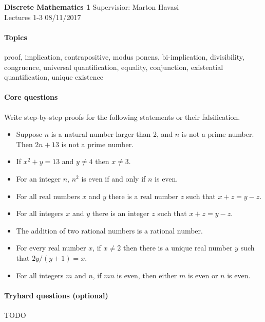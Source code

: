 \documentclass{exam}
\begin{document}
\noindent
\large\textbf{Discrete Mathematics 1} \hfill Supervisior: Marton Havasi \\
\normalsize Lectures 1-3 \hfill 08/11/2017
\paragraph{Topics}

proof, implication, contrapositive, modus ponens, bi-implication, divisibility, congruence, universal quantification, equality, conjunction, existential quantification, unique existence 

\paragraph{Core questions}
\begin{questions}
\question Write step-by-step proofs for the following statements or their falsification.

\begin{itemize}
\item Suppose $n$ is a natural number larger than 2, and $n$ is not a prime number. Then $2n + 13$ is not a prime
number.

\item If $x^2+y = 13$ and $y\neq 4$ then $x\neq 3$.

\item For an integer $n$, $n^2$ is even if and only if $n$ is even.

\item For all real numbers $x$ and $y$ there is a real number $z$ such that $x + z = y - z$.

\item For all integers $x$ and $y$ there is an integer $z$ such that $x + z = y - z$.

\item The addition of two rational numbers is a rational number.

\item For every real number $x$, if $x\neq 2$ then there is a unique real number $y$ such that $2y/(y + 1) = x$.

\item For all integers $m$ and $n$, if $mn$ is even, then either $m$ is even or $n$ is even.

\end{itemize}
\end{questions}

\paragraph{Tryhard questions (optional)}
\begin{questions}
\question TODO
\end{questions}
\end{document}
